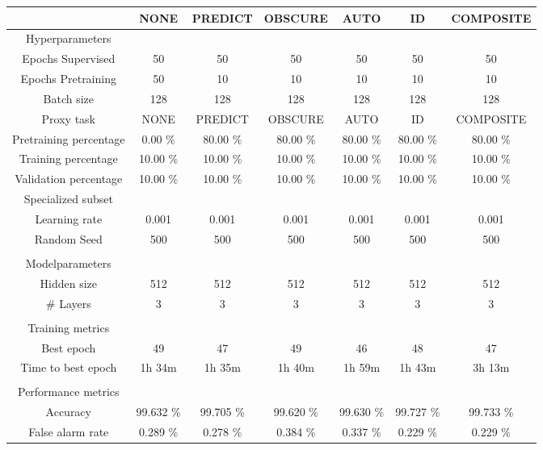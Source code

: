 \begin{table}[htb]
    \centering
    \begin{tabular}{@{}ccccccc@{}}
        \toprule
         &  NONE &  PREDICT &  OBSCURE &  AUTO &  ID &  COMPOSITE \\
        \midrule
        Hyperparameters &  &  &  &  &  &  \\
        Epochs Supervised &  50 &  50 &  50 &  50 &  50 &  50 \\
        Epochs Pretraining &  50 &  10 &  10 &  10 &  10 &  10 \\
        Batch size &  128 &  128 &  128 &  128 &  128 &  128 \\
        Proxy task &  NONE &  PREDICT &  OBSCURE &  AUTO &  ID &  COMPOSITE \\
        Pretraining percentage &  0.00 \% &  80.00 \% &  80.00 \% &  80.00 \% &  80.00 \% &  80.00 \% \\
        Training percentage &  10.00 \% &  10.00 \% &  10.00 \% &  10.00 \% &  10.00 \% &  10.00 \% \\
        Validation percentage &  10.00 \% &  10.00 \% &  10.00 \% &  10.00 \% &  10.00 \% &  10.00 \% \\
        Specialized subset &   &   &   &   &   &   \\
        Learning rate &  0.001 &  0.001 &  0.001 &  0.001 &  0.001 &  0.001 \\
        Random Seed &  500 &  500 &  500 &  500 &  500 &  500 \\
         \\
        Modelparameters &  &  &  &  &  &  \\
        Hidden size &  512 &  512 &  512 &  512 &  512 &  512 \\
        \# Layers &  3 &  3 &  3 &  3 &  3 &  3 \\
         \\
        Training metrics &  &  &  &  &  &  \\
        Best epoch &  49 &  47 &  49 &  46 &  48 &  47 \\
        Time to best epoch &  1h 34m &  1h 35m &  1h 40m &  1h 59m &  1h 43m &  3h 13m \\
         \\
        Performance metrics &  &  &  &  &  &  \\
        Accuracy &  99.632 \% &  99.705 \% &  99.620 \% &  99.630 \% &  99.727 \% &  99.733 \% \\
        False alarm rate &  0.289 \% &  0.278 \% &  0.384 \% &  0.337 \% &  0.229 \% &  0.229 \% \\

\end{tabular}
\end{table}
